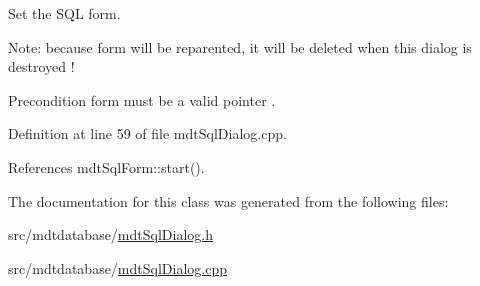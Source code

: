 Set the S\-Q\-L form. 

Note\-: because form will be reparented, it will be deleted when this dialog is destroyed !

\begin{DoxyPrecond}{Precondition}
form must be a valid pointer . 
\end{DoxyPrecond}


Definition at line 59 of file mdt\-Sql\-Dialog.\-cpp.



References mdt\-Sql\-Form\-::start().



The documentation for this class was generated from the following files\-:\begin{DoxyCompactItemize}
\item 
src/mdtdatabase/\hyperlink{mdt_sql_dialog_8h}{mdt\-Sql\-Dialog.\-h}\item 
src/mdtdatabase/\hyperlink{mdt_sql_dialog_8cpp}{mdt\-Sql\-Dialog.\-cpp}\end{DoxyCompactItemize}
